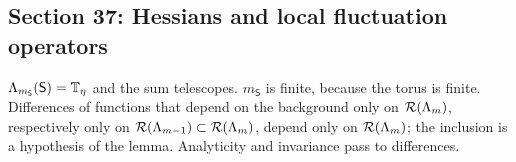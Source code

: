 \subsection{Section 37: Hessians and local fluctuation operators}\label{d8:s37}

\begin{detail}\label{d8:ix10}
$\Lambda_{m_{\mathsf S}}(\mathsf S)=\mathbb T_\eta$ and the sum telescopes. $m_{\mathsf S}$ is finite, because the torus is finite. Differences of functions that depend on the background only on $\mathcal R(\Lambda_m)$, respectively only on $\mathcal R(\Lambda_{m-1})\subset\mathcal R(\Lambda_m)$, depend only on $\mathcal R(\Lambda_m)$; the inclusion is a hypothesis of the lemma. Analyticity and invariance pass to differences.
\end{detail}

